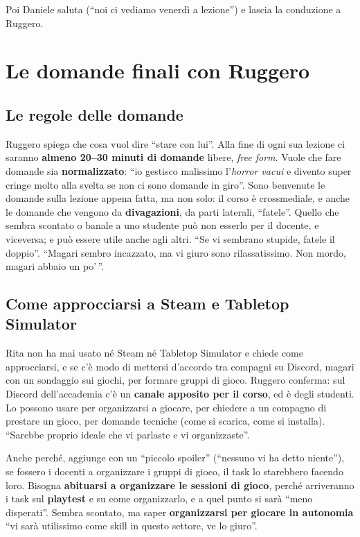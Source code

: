 Poi Daniele saluta (``noi ci vediamo venerdì a lezione'') e lascia la
conduzione a Ruggero.

\section{Le domande finali con Ruggero}
\label{a1:sec:domande}

\subsection{Le regole delle domande}

Ruggero spiega che cosa vuol dire ``stare con lui''. Alla fine di ogni sua
lezione ci saranno \textbf{almeno 20--30 minuti di domande} libere, \emph{free
form}. Vuole che fare domande sia \textbf{normalizzato}: ``io gestisco malissimo
l'\emph{horror vacui} e divento super cringe molto alla svelta se non ci sono
domande in giro''. Sono benvenute le domande sulla lezione appena fatta, ma non
solo: il corso è crossmediale, e anche le domande che vengono da
\textbf{divagazioni}, da parti laterali, ``fatele''. Quello che sembra scontato o
banale a uno studente può non esserlo per il docente, e viceversa; e può essere
utile anche agli altri. ``Se vi sembrano stupide, fatele il doppio''. ``Magari
sembro incazzato, ma vi giuro sono rilassatissimo. Non mordo, magari abbaio un
po'\,''.

\subsection{Come approcciarsi a Steam e Tabletop Simulator}

Rita non ha mai usato né Steam né Tabletop Simulator e chiede come
approcciarsi, e se c'è modo di mettersi d'accordo tra compagni su Discord, magari
con un sondaggio sui giochi, per formare gruppi di gioco. Ruggero conferma: sul
Discord dell'accademia c'è un \textbf{canale apposito per il corso}, ed è degli
studenti. Lo possono usare per organizzarsi a giocare, per chiedere a un
compagno di prestare un gioco, per domande tecniche (come si scarica, come si
installa). ``Sarebbe proprio ideale che vi parlaste e vi organizzaste''.

Anche perché, aggiunge con un ``piccolo spoiler'' (``nessuno vi ha detto
niente''), se fossero i docenti a organizzare i gruppi di gioco, il task lo
starebbero facendo loro. Bisogna \textbf{abituarsi a organizzare le sessioni di
gioco}, perché arriveranno i task sul \textbf{playtest} e su come organizzarlo,
e a quel punto si sarà ``meno disperati''. Sembra scontato, ma saper
\textbf{organizzarsi per giocare in autonomia} ``vi sarà utilissimo come skill in
questo settore, ve lo giuro''.

